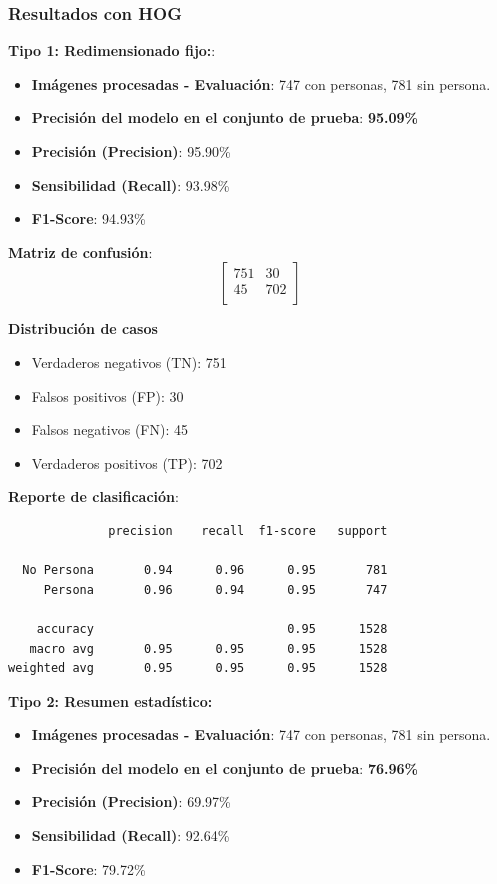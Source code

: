 \documentclass[a4paper]{article}
\begin{document}
\vspace{0.5cm}
\subsubsection*{Resultados con HOG}

\textbf{Tipo 1: Redimensionado fijo:}:

\begin{itemize}
    \item \textbf{Imágenes procesadas - Evaluación}: 747 con personas, 781 sin persona.
    \item \textbf{Precisión del modelo en el conjunto de prueba}: \textbf{95.09\%}
    \item \textbf{Precisión (Precision)}: 95.90\%
    \item \textbf{Sensibilidad (Recall)}: 93.98\%
    \item \textbf{F1-Score}: 94.93\%
\end{itemize}

\textbf{Matriz de confusión}:
\[
\begin{bmatrix}
751 & 30 \\
45 & 702 \\
\end{bmatrix}
\]

\textbf{Distribución de casos}
\begin{itemize}
    \item Verdaderos negativos (TN): 751
    \item Falsos positivos (FP): 30
    \item Falsos negativos (FN): 45
    \item Verdaderos positivos (TP): 702
\end{itemize}

\textbf{Reporte de clasificación}:

\begin{verbatim}
              precision    recall  f1-score   support

  No Persona       0.94      0.96      0.95       781
     Persona       0.96      0.94      0.95       747

    accuracy                           0.95      1528
   macro avg       0.95      0.95      0.95      1528
weighted avg       0.95      0.95      0.95      1528
\end{verbatim}

\textbf{Tipo 2: Resumen estadístico:}
\begin{itemize}
    \item \textbf{Imágenes procesadas - Evaluación}: 747 con personas, 781 sin persona.
    \item \textbf{Precisión del modelo en el conjunto de prueba}: \textbf{76.96\%}
    \item \textbf{Precisión (Precision)}: 69.97\%
    \item \textbf{Sensibilidad (Recall)}: 92.64\%
    \item \textbf{F1-Score}: 79.72\%
\end{itemize}
\end{document}
